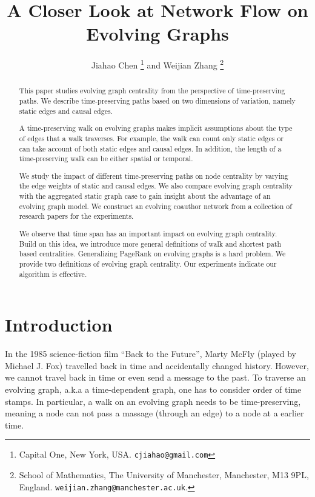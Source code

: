 \documentclass[12pt]{article}
\title{A Closer Look at Network Flow on Evolving Graphs}
\author{Jiahao Chen \thanks{
Capital One,
New York, USA.
\texttt{cjiahao@gmail.com}
}
 and
Weijian Zhang
\thanks{%
  School of Mathematics,
The University of Manchester,
                Manchester, M13 9PL, England.
\texttt{weijian.zhang@manchester.ac.uk}.
}
}
\theoremstyle{definition}
\begin{document}


\maketitle

\begin{abstract}
This paper studies evolving graph centrality from the perspective of time-preserving paths. We describe time-preserving paths based on two dimensions of variation, namely static edges and causal edges.

A time-preserving walk on evolving graphs makes implicit assumptions about the type of edges that a walk traverses. For example, the walk can count only static edges or can take account of both static edges and causal edges. In addition, the length of a time-preserving walk can be either spatial or temporal.

We study the impact of different time-preserving paths on node centrality by varying the edge weights of static and causal edges.
We also compare evolving graph centrality with the aggregated static graph case to gain insight about the advantage of an evolving graph model.
We construct an evolving coauthor network from a collection of research papers for the experiments.

We observe that time span has an important impact on evolving graph centrality. Build on this idea,
we introduce more general definitions of walk and shortest path based centralities. Generalizing PageRank on evolving graphs is a hard problem. We provide two definitions of evolving graph centrality. Our experiments indicate our algorithm is effective.

\end{abstract}

\section{Introduction}
\label{sec:introduction}

In the 1985 science-fiction film ``Back to the Future'', Marty McFly (played by Michael J. Fox) travelled back in time and accidentally changed history.
However, we cannot travel back in time or even send a message to the past.
To traverse an evolving graph, a.k.a a time-dependent graph, one has to consider order of time stamps. In particular, a walk on an evolving graph needs to be time-preserving, meaning a node can not pass a massage (through an edge) to a node at a earlier time.
\end{document}
